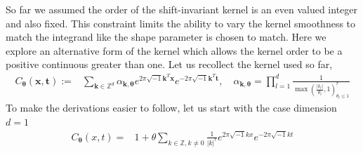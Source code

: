 \documentclass{iitthesis}          %
\newcommand{\bm}[1]{\boldsymbol{#1}}
\newcommand{\vtheta}{{\bm{\theta}}}
\newcommand{\vk}{\bm{k}}
\newcommand{\vt}{\bm{t}}
\newcommand{\vx}{\bm{x}}
\def\abs#1{\ensuremath{\left \lvert #1 \right \rvert}}
\begin{document}
\label{sec:non_integer_kernel_order}
So far we assumed the order of the shift-invariant kernel is an even valued integer and also fixed. This constraint limits the ability to vary the kernel smoothness to match the integrand like the shape parameter is chosen to match. Here we explore an alternative form of the kernel which allows the kernel order to be a positive continuous greater than one. Let us recollect the kernel used so far,
\begin{align*}
C_\vtheta(\vx, \vt) := &  \sum_{\vk \in \mathbb{Z}^d} \alpha_{\vk,\vtheta}  e^{2 \pi\sqrt{-1} \vk^T\vx}
e^{-2 \pi\sqrt{-1} \vk^T\vt}, \quad \alpha_{\vk,\vtheta} = \prod_{l=1}^d \frac{1}{\max(\frac{|k_l|}{\theta_l},1)^r_{\theta_l\leq 1}} 
\end{align*}
To make the derivations easier to follow, let us start with the case dimension $d=1$
\begin{align*}
C_\vtheta(x, t) = & 1 + \theta \sum_{k \in \mathbb{Z}, k \neq 0 } \frac{1}{\abs{k}^r} 
e^{ 2 \pi\sqrt{-1} k x}
e^{-2 \pi\sqrt{-1} k t}
\end{align*}

\end{document}
